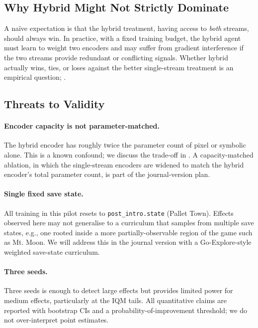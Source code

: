 \subsection{Why Hybrid Might Not Strictly Dominate}

A naïve expectation is that the hybrid treatment, having access to
\emph{both} streams, should always win.  In practice, with a fixed
training budget, the hybrid agent must learn to weight two encoders
and may suffer from gradient interference if the two streams provide
redundant or conflicting signals.  Whether hybrid actually wins, ties,
or loses against the better single-stream treatment is an empirical
question; .

\subsection{Threats to Validity}

\paragraph{Encoder capacity is not parameter-matched.}
The hybrid encoder has roughly twice the parameter count of pixel or
symbolic alone.  This is a known confound; we discuss the trade-off in
.  A capacity-matched ablation, in which the
single-stream encoders are widened to match the hybrid encoder's
total parameter count, is part of the journal-version plan.

\paragraph{Single fixed save state.}
All training in this pilot resets to \texttt{post\_intro.state}
(Pallet Town).  Effects observed here may not generalise to a
curriculum that samples from multiple save states, e.g., one rooted
inside a more partially-observable region of the game such as Mt.
Moon.  We will address this in the journal version with a
Go-Explore-style weighted save-state curriculum.

\paragraph{Three seeds.}
Three seeds is enough to detect large effects but provides limited
power for medium effects, particularly at the IQM tails.  All
quantitative claims are reported with bootstrap CIs and a
probability-of-improvement threshold; we do not over-interpret point
estimates.

